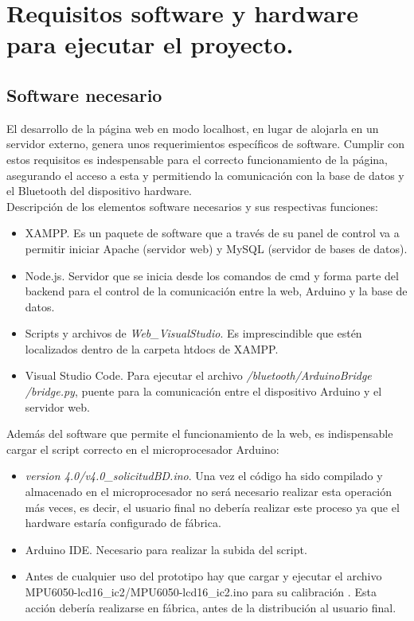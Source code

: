 

\section{Requisitos software y hardware para ejecutar el proyecto.}

\subsection{Software necesario}
El desarrollo de la página web en modo localhost, en lugar de alojarla en un servidor externo, genera unos requerimientos específicos de software. Cumplir con estos requisitos es indespensable para el correcto funcionamiento de la página, asegurando el acceso a esta y permitiendo la comunicación con la base de datos y el Bluetooth del dispositivo hardware.\\

Descripción de los elementos software necesarios y sus respectivas funciones:
\begin{itemize}
    \item XAMPP. Es un paquete de software que a través de su panel de control va a permitir iniciar Apache (servidor web) y MySQL (servidor de bases de datos).
    \item Node.js. Servidor que se inicia desde los comandos de cmd y forma parte del backend para el control de la comunicación entre la web, Arduino y la base de datos.
    \item Scripts y archivos de \textit{Web\_VisualStudio}. Es imprescindible que estén localizados dentro de la carpeta htdocs de XAMPP.
    \item Visual Studio Code. Para ejecutar el archivo \textit{/bluetooth/ArduinoBridge \\ /bridge.py}, puente para la comunicación entre el dispositivo Arduino y el servidor web.
\end{itemize}

Además del software que permite el funcionamiento de la web, es indispensable cargar el script correcto en el microprocesador Arduino:
\begin{itemize}
    \item \textit{version 4.0/v4.0\_solicitudBD.ino}. Una vez el código ha sido compilado y almacenado en el microprocesador no será necesario realizar esta operación más veces, es decir, el usuario final no debería realizar este proceso ya que el hardware estaría configurado de fábrica.
    \item Arduino IDE. Necesario para realizar la subida del script.
    \item Antes de cualquier uso del prototipo hay que cargar y ejecutar el archivo MPU6050-lcd16\_ic2/MPU6050-lcd16\_ic2.ino para su calibración \cite{saragonz91:online}. Esta acción debería realizarse en fábrica, antes de la distribución al usuario final. 
\end{itemize}

